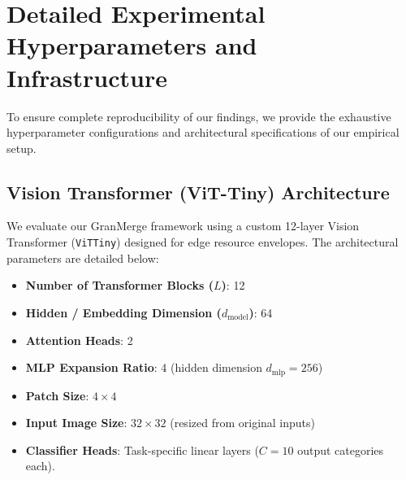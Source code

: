 \documentclass{article}
\theoremstyle{plain}
\theoremstyle{definition}
\theoremstyle{remark}
\begin{document}










\newpage
\appendix
\onecolumn

\section{Detailed Experimental Hyperparameters and Infrastructure}
\label{app:hyperparams}

To ensure complete reproducibility of our findings, we provide the exhaustive hyperparameter configurations and architectural specifications of our empirical setup.

\subsection{Vision Transformer (ViT-Tiny) Architecture}
We evaluate our GranMerge framework using a custom 12-layer Vision Transformer (\texttt{ViTTiny}) designed for edge resource envelopes. The architectural parameters are detailed below:
\begin{itemize}
    \item \textbf{Number of Transformer Blocks ($L$)}: 12
    \item \textbf{Hidden / Embedding Dimension ($d_{\text{model}}$)}: 64
    \item \textbf{Attention Heads}: 2
    \item \textbf{MLP Expansion Ratio}: 4 (hidden dimension $d_{\text{mlp}} = 256$)
    \item \textbf{Patch Size}: $4 \times 4$
    \item \textbf{Input Image Size}: $32 \times 32$ (resized from original inputs)
    \item \textbf{Classifier Heads}: Task-specific linear layers ($C = 10$ output categories each).
\end{itemize}
\end{document}
